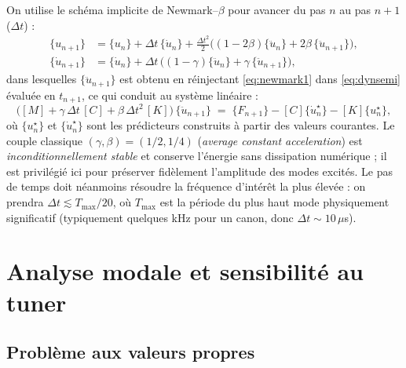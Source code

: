 \documentclass[12pt,a4paper]{article}
\begin{document}
	On utilise le schéma implicite de Newmark--$\beta$ pour avancer du pas $n$ au pas $n+1$ ($\Delta t$) :
	\begin{align}
		\{u_{n+1}\} &= \{u_n\} + \Delta t\, \{\dot u_n\} + \tfrac{\Delta t^2}{2}\!\big((1-2\beta)\{\ddot u_n\} + 2\beta\,\{\ddot u_{n+1}\}\big), \label{eq:newmark1} \\
		\{\dot u_{n+1}\} &= \{\dot u_n\} + \Delta t\,\big((1-\gamma)\{\ddot u_n\} + \gamma\,\{\ddot u_{n+1}\}\big), \label{eq:newmark2}
	\end{align}
	dans lesquelles $\{\ddot u_{n+1}\}$ est obtenu en réinjectant \eqref{eq:newmark1} dans \eqref{eq:dynsemi} évaluée en $t_{n+1}$, ce qui conduit au système linéaire :
	\begin{equation}
		\Big([M] + \gamma\,\Delta t\,[C] + \beta\,\Delta t^2\,[K]\Big)\,\{\ddot u_{n+1}\} \;=\; \{F_{n+1}\} - [C]\{\dot u_n^\star\} - [K]\{u_n^\star\},
	\end{equation}
	où $\{u_n^\star\}$ et $\{\dot u_n^\star\}$ sont les prédicteurs construits à partir des valeurs courantes. Le couple classique $(\gamma,\beta) = (1/2, 1/4)$ (\emph{average constant acceleration}) est \emph{inconditionnellement stable} et conserve l'énergie sans dissipation numérique ; il est privilégié ici pour préserver fidèlement l'amplitude des modes excités. Le pas de temps doit néanmoins résoudre la fréquence d'intérêt la plus élevée : on prendra $\Delta t \lesssim T_{\max}/20$, où $T_{\max}$ est la période du plus haut mode physiquement significatif (typiquement quelques kHz pour un canon, donc $\Delta t \sim 10\,\mu$s).

	\section{Analyse modale et sensibilité au tuner}
	\label{sec:modale}

	\subsection{Problème aux valeurs propres}
\end{document}
